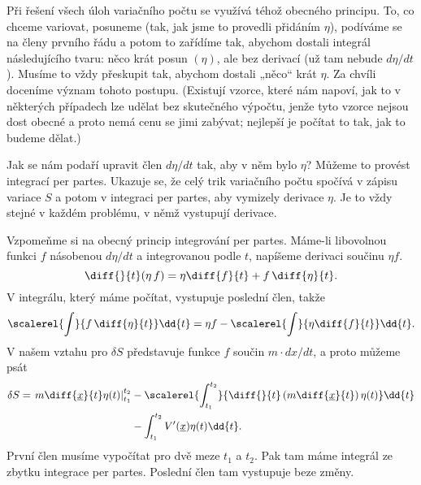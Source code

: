     Při řešení všech úloh variačního počtu se využívá téhož obecného principu. To, co chceme
    variovat, posuneme (tak, jak jsme to provedli přidáním \(\eta\)), podíváme se na členy prvního
    řádu a potom to zařídíme tak, abychom dostali integrál následujícího tvaru: něco krát posun
    \((\eta)\), ale bez derivací (už tam nebude \(d\eta/dt\)). Musíme to vždy přeskupit tak, abychom
    dostali „něco“ krát \(\eta\). Za chvíli doceníme význam tohoto postupu. (Existují vzorce, které
    nám napoví, jak to v některých případech lze udělat bez skutečného výpočtu, jenže tyto vzorce
    nejsou dost obecné a proto nemá cenu se jimi zabývat; nejlepší je počítat to tak, jak to budeme
    dělat.)

    Jak se nám podaří upravit člen \(d\eta/dt\) tak, aby v něm bylo \(\eta\)? Můžeme to provést
    integrací per partes. Ukazuje se, že celý trik variačního počtu spočívá v zápisu variace \(S\) a
    potom v integraci per partes, aby vymizely derivace \(\eta\). Je to vždy stejné v každém
    problému, v němž vystupují derivace. 
    
    Vzpomeňme si na obecný princip integrování per partes. Máme-li libovolnou funkci \(f\) násobenou
    \(d\eta/dt\) a integrovanou podle \(t\), napíšeme derivaci součinu \(\eta f\).
    \begin{equation*}
      \diff{}{t}(\eta\,f) = \eta\diff{f}{t} + f\,\diff{\eta}{t}.
    \end{equation*}  
    V integrálu, který máme počítat, vystupuje poslední člen, takže
    \begin{equation*}
      \scalerel{\int}{f\,\diff{\eta}{t}}\dd{t} = \eta f - \scalerel{\int}{\eta\diff{f}{t}}\dd{t}.
    \end{equation*}  
    V našem vztahu pro \(\delta S\) představuje funkce \(f\) součin \(m\cdot dx/dt\), a proto můžeme
    psát
    \begin{align*}
      \delta S = \left.m\diff{\underline{x}}{t}\eta(t)\right\rvert^{t_2}_{t_1} 
               &- \scalerel{\int^{t_2}_{t_1}}{\diff{}{t}
                    \left(m\diff{\underline{x}}{t}\right)\eta(t)
                  }\dd{t}   \\
               &- \int^{t_2}_{t_1} V'(\underline{x})\eta(t)\dd{t}.
    \end{align*} 
    První člen musíme vypočítat pro dvě meze \(t_1\) a \(t_2\). Pak tam máme integrál ze zbytku
    integrace per partes. Poslední člen tam vystupuje beze změny.

